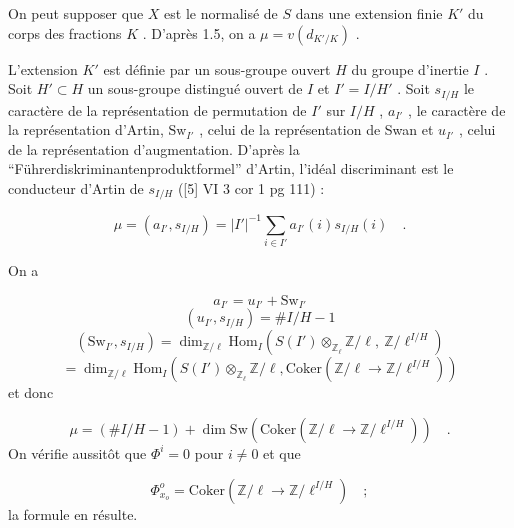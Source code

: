 On peut supposer que $X$ est le normalisé de $S$ dans une extension finie $K'$ du corps des fractions $K$ . D'après 1.5, on a $\mu = v(d_{K'/K})$ .

L'extension $K'$ est définie par un sous-groupe ouvert $H$ du groupe d'inertie $I$ . Soit $H' \subset H$ un sous-groupe distingué ouvert de $I$ et $I' = I/H'$ . Soit $s_{I/H}$ le caractère de la représentation de permutation de $I'$ sur $I/H$ , $a_{I'}$ , le caractère de la représentation d'Artin, $\mathrm{Sw}_{I'}$ , celui de la représentation de Swan et $u_{I'}$ , celui de la représentation d'augmentation. D'après la ``Führerdiskriminantenproduktformel'' d'Artin, l'idéal discriminant est le conducteur d'Artin de $s_{I/H}$ ([5] VI 3 cor 1 pg 111) :

\begin{equation*}
\mu = (a_{I'},s_{I/H}) = |I'|^{-1} \sum_{i \in I'} a_{I'}(i)s_{I/H}(i) \quad .
\end{equation*}


On a

\begin{equation*}
a_{I'} = u_{I'} + \mathrm{Sw}_{I'}
\end{equation*}
\begin{equation*}
(u_{I'},s_{I/H}) = \# I/H - 1
\end{equation*}
\begin{equation*}
(\mathrm{Sw}_{I'},s_{I/H}) = \dim_{\mathbb{Z}/\ell} \mathrm{Hom}_I(S(I') \otimes_{\mathbb{Z}_\ell} \mathbb{Z}/\ell, \ \mathbb{Z}/\ell^{I/H})
\end{equation*}
\begin{equation*}
= \dim_{\mathbb{Z}/\ell} \mathrm{Hom}_I(S(I') \otimes_{\mathbb{Z}_\ell} \mathbb{Z}/\ell, \mathrm{Coker}( \mathbb{Z}/\ell \to \mathbb{Z}/\ell^{I/H}))
\end{equation*}
et donc

\begin{equation*}
\mu = (\# I/H - 1) + \dim \mathrm{Sw} (\mathrm{Coker}( \mathbb{Z}/\ell \to \mathbb{Z}/\ell^{I/H})) \quad .
\end{equation*}
On vérifie aussitôt que $\Phi^i = 0$ pour $i \neq 0$ et que

\begin{equation*}
\Phi^o_{x_o} = \mathrm{Coker}( \mathbb{Z}/\ell \to \mathbb{Z}/\ell^{I/H}) \quad ;
\end{equation*}
la formule en résulte.

